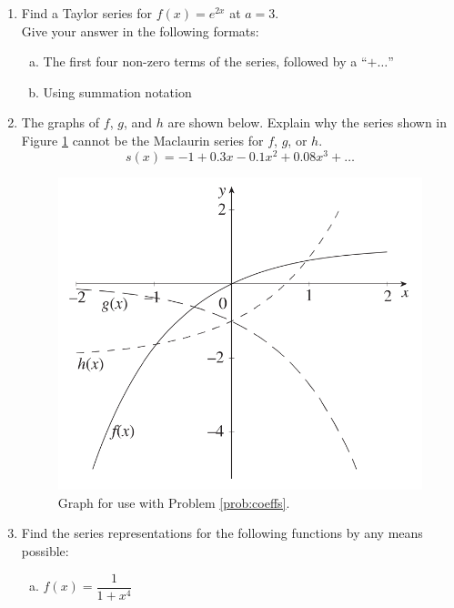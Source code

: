 \begin{enumerate}
\item Find a Taylor series for \(f(x) = e^{2x}\) at \(a=3\).\\
Give your answer in the following formats:

\begin{enumerate}[(a)]

\item The first four non-zero terms of the series, followed by a ``\(+\ldots\)''

\item Using summation notation

\end{enumerate}

\vfill



\item The graphs of \(f\), \(g\), and \(h\) are shown below. Explain why the series shown in Figure \ref{fig:coeffs} cannot be the Maclaurin series for \(f\), \(g\), or \(h\). \label{prob:coeffs}
\[
s(x) = -1+0.3 x - 0.1x^2+0.08x^3+\ldots
\]

\begin{figure}[!h]

\includegraphics[width=.4\textwidth]{Ch8s7-ws2-prob3.png}
\caption{Graph for use with Problem \ref{prob:coeffs}.}
\label{fig:coeffs}
\end{figure}

\item  Find the series representations for the following functions by any means possible:

\begin{enumerate}[(a)]

\item \(f(x) = \dfrac{1}{1+x^4}\)

\vspace*{.75in}


\end{enumerate}
\end{enumerate}
